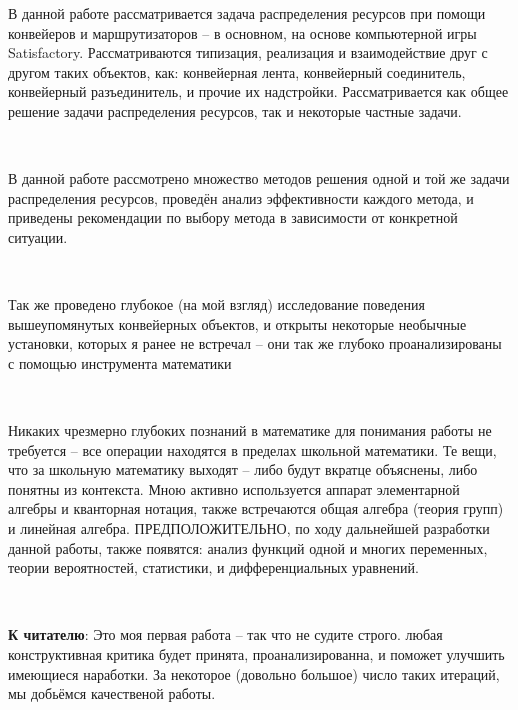\documentclass[twoside, a3paper]{report}
\begin{document}


В данной работе рассматривается задача распределения ресурсов при помощи конвейеров и маршрутизаторов -- в основном, на основе компьютерной игры Satisfactory. Рассматриваются типизация, реализация и взаимодействие друг с другом таких объектов, как: конвейерная лента, конвейерный соединитель, конвейерный разъединитель, и прочие их надстройки. Рассматривается как общее решение задачи распределения ресурсов, так и некоторые частные задачи.

\

В данной работе рассмотрено множество методов решения одной и той же задачи распределения ресурсов, проведён анализ эффективности каждого метода, и приведены рекомендации по выбору метода в зависимости от конкретной ситуации.

\

Так же проведено глубокое (на мой взгляд) исследование поведения вышеупомянутых конвейерных объектов, и открыты некоторые необычные установки, которых я ранее не встречал -- они так же глубоко проанализированы с помощью инструмента математики

\

Никаких чрезмерно глубоких познаний в математике для понимания работы не требуется -- все операции находятся в пределах школьной математики. Те вещи, что за школьную математику выходят -- либо будут вкратце объяснены, либо понятны из контекста. Мною активно используется аппарат элементарной алгебры и кванторная нотация, также встречаются общая алгебра (теория групп) и линейная алгебра. ПРЕДПОЛОЖИТЕЛЬНО, по ходу дальнейшей разработки данной работы, также появятся: анализ функций одной и многих переменных, теории вероятностей, статистики, и дифференциальных уравнений.

\

\textbf{К читателю}: Это моя первая работа -- так что не судите строго. любая конструктивная критика будет принята, проанализированна, и поможет улучшить имеющиеся наработки. За некоторое (довольно большое) число таких итераций, мы добьёмся качественой работы.


\tableofcontents




















%
\end{document}
